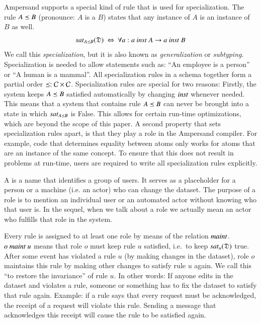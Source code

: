 \documentclass{elsarticle}
\begin{document}
   Ampersand supports a special kind of rule that is used for specialization.
   The rule $A\preceq B$ (pronounce: $A$ is a $B$) states that any instance of $A$ is an instance of $B$ as well.
\begin{equation}
   \label{eqn:specialization}
   \sat{A\isa B}{\dataset}\ \Leftrightarrow\ \forall a: a\ \inst\ A\rightarrow a\ \inst\ B
\end{equation}
   We call this {\em specialization}, but it is also known as {\em generalization} or {\em subtyping}.
   Specialization is needed to allow statements such as: ``An employee is a person'' or ``A human is a mammal''.
   All specialization rules in a schema together form a partial order $\preceq : \mathcal{C}\times\mathcal{C}$.
   Specialization rules are special for two reasons:
   Firstly, the system keeps $A\preceq B$ satisfied automatically by changing $\text{\it inst\/}$ whenever needed.
   This means that a system that contains rule $A\preceq B$ can never be brought into a state in which $\text{\it sat\/}_{A\preceq B}$ is False.
   This allows for certain run-time optimizations, which are beyond the scope of this paper.
   A second property that sets specialization rules apart, is that they play a role in the Ampersand compiler.
   For example, code that determines equality between atoms only works for atoms that are an instance of the same concept.
   To ensure that this does not result in problems at run-time, users are required to write all specialization rules explicitly.


   A  is a name that identifies a group of users.
   It serves as a placeholder for a person or a machine (i.e. an actor) who can change the dataset.
   The purpose of a role is to mention an individual user or an automated actor without knowing who that user is.
   In the sequel, when we talk about a role we actually mean an actor who fulfills that role in the system.

   Every rule is assigned to at least one role by means of the relation $\text{\it maint\/}$.
   $o\ \text{\it maint\/}\ u$ means that role $o$ must keep rule $u$ satisfied, i.e.\ to keep $\text{\it sat\/}_{u}(\mathfrak{D})$ true.
   After some event has violated a rule $u$ (by making changes in the dataset),
   role $o$ maintains this rule by making other changes to satisfy rule $u$ again.
   We call this ``to restore the invariance'' of rule $u$.
   In other words: If anyone edits in the dataset and violates a rule, someone or something has to fix the dataset to satisfy that rule again.
   Example: if a rule says that every request must be acknowledged, the receipt of a request will violate this rule.
   Sending a message that acknowledges this receipt will cause the rule to be satisfied again.
\end{document}
